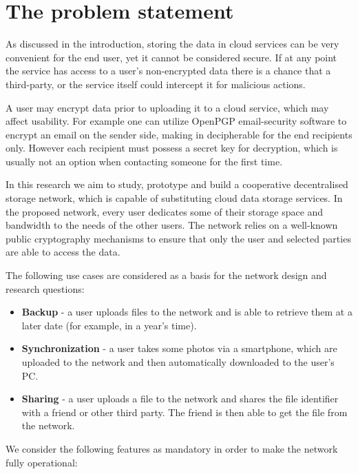 \section{The problem statement}

As discussed in the introduction, storing the data in cloud services
can be very convenient for the end user, yet it cannot be considered
secure. If at any point the service has access to a user's non-encrypted
data there is a chance that a third-party, or the service itself
could intercept it for malicious actions.

A user may encrypt data prior to uploading it to a cloud service,
which may affect usability.
For example one can utilize OpenPGP email-security software \citep{rfc3156} to
encrypt an email on the sender side, making in decipherable for
the end recipients only. However each recipient must possess a secret
key for decryption, which is usually not an option when contacting
someone for the first time.

In this research we aim to study, prototype and build a
cooperative decentralised \pp storage network, which is capable
of substituting cloud data storage services. In the proposed \pp network,
every user dedicates some of their storage space and bandwidth
to the needs of the other users. The network relies on
a well-known public cryptography mechanisms to ensure that
only the user and selected parties are able to access the data.

The following use cases are considered as a basis for the
network design and research questions:

\begin{itemize}
\item \textbf{Backup} - a user uploads files to the network and
      is able to retrieve them at a later date (for example,
      in a year's time).
\item \textbf{Synchronization} - a user takes some photos via a smartphone,
      which are uploaded to the network and then automatically
      downloaded to the user's PC.
\item \textbf{Sharing} - a user uploads a file to the network and
      shares the file identifier with a friend or other third party.
      The friend is then able to get the file from the network.
\end{itemize}

We consider the following features as mandatory in order to make
the network fully operational:

